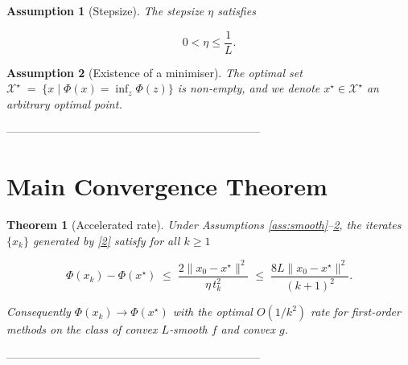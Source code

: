 \documentclass{article}
\newtheorem{theorem}{Theorem}
\newtheorem{assumption}{Assumption}
\begin{document}
\begin{assumption}[Stepsize]\label{ass:stepsize}
The stepsize $\eta$ satisfies  

\[
0<\eta\le\frac{1}{L}.
\tag{A3}
\]
\end{assumption}

\begin{assumption}[Existence of a minimiser]\label{ass:opt}
The optimal set $\mathcal{X}^\star\;=\;\{x\mid \Phi(x)=\inf_{z}\Phi(z)\}$ is non‑empty, and we denote $x^\star\in\mathcal{X}^\star$ an arbitrary optimal point.
\end{assumption}

--------------------------------------------------------------------

\section*{Main Convergence Theorem}
\begin{theorem}[Accelerated rate]\label{thm:rate}
Under Assumptions \ref{ass:smooth}–\ref{ass:opt}, the iterates $\{x_k\}$ generated by \eqref{2} satisfy for all $k\ge 1$

\[
\Phi(x_k)-\Phi(x^\star)\;\le\;
\frac{2\|x_0-x^\star\|^{2}}{\eta\,t_k^{2}}
\;\le\;
\frac{8L\|x_0-x^\star\|^{2}}{(k+1)^{2}} .
\tag{3}
\]

Consequently $\Phi(x_k)\to\Phi(x^\star)$ with the optimal $O(1/k^{2})$ rate for first‑order methods on the class of convex $L$‑smooth $f$ and convex $g$.
\end{theorem}

--------------------------------------------------------------------
\end{document}
